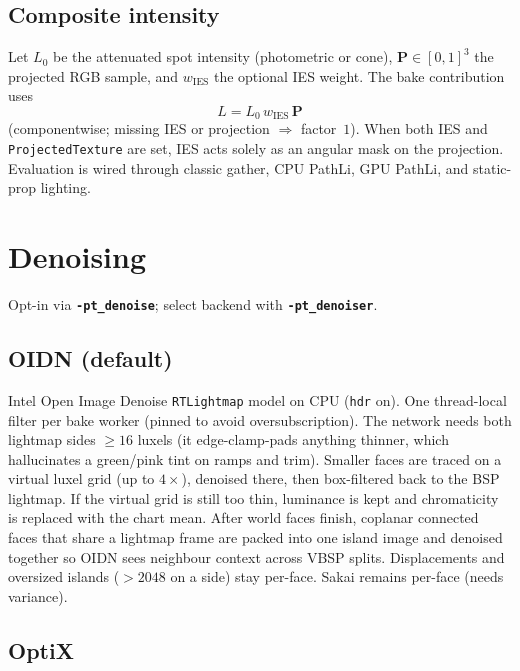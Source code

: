 \documentclass[11pt,a4paper]{article}
\newcommand{\flag}[1]{\texttt{\bfseries #1}}
\newcommand{\code}[1]{\texttt{#1}}
\newcommand{\vect}[1]{\bm{#1}}
\begin{document}
\subsection{Composite intensity}

Let $L_0$ be the attenuated spot intensity (photometric or cone),
$\vect{P}\in[0,1]^{3}$ the projected RGB sample, and $w_{\mathrm{IES}}$ the
optional IES weight. The bake contribution uses
\begin{equation}
  L = L_0\, w_{\mathrm{IES}}\, \vect{P}
\end{equation}
(componentwise; missing IES or projection $\Rightarrow$ factor~$1$).
When both IES and \code{ProjectedTexture} are set, IES acts solely as an
angular mask on the projection. Evaluation is wired through classic gather,
CPU PathLi, GPU PathLi, and static-prop lighting.

\section{Denoising}
\label{sec:denoise}

Opt-in via \flag{-pt\_denoise}; select backend with \flag{-pt\_denoiser}.

\subsection{OIDN (default)}

Intel Open Image Denoise \code{RTLightmap} model on CPU (\texttt{hdr} on).
One thread-local filter per bake worker (pinned to avoid oversubscription).
The network needs both lightmap sides $\ge 16$ luxels (it edge-clamp-pads
anything thinner, which hallucinates a green/pink tint on ramps and trim).
Smaller faces are traced on a virtual luxel grid (up to $4\times$), denoised
there, then box-filtered back to the BSP lightmap. If the virtual grid is
still too thin, luminance is kept and chromaticity is replaced with the
chart mean. After world faces finish, coplanar connected faces that share a
lightmap frame are packed into one island image and denoised together so
OIDN sees neighbour context across VBSP splits.
Displacements and oversized islands ($>2048$ on a side) stay per-face.
Sakai remains per-face (needs variance).

\subsection{OptiX}
\end{document}
